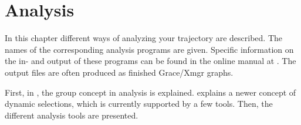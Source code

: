 %
%
%
%
%
%
%

\chapter{Analysis}
\label{ch:analysis}
In this chapter different ways of analyzing your trajectory are described. 
The names of the corresponding analysis programs are given. 
Specific information on the in- and output of these programs can be found 
in the online manual at {\wwwpage}.
The output files are often produced as finished Grace/Xmgr graphs.

First, in , the group concept in analysis is explained. 
 explains a newer concept of dynamic selections,
which is currently supported by a few tools.
Then, the different analysis tools are presented.


